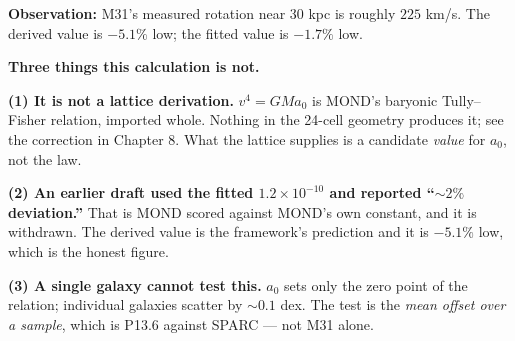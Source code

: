 \documentclass[11pt, letterpaper, openany]{book}
\begin{document}
\textbf{Observation:} M31's measured rotation near 30 kpc is roughly $225$ km/s. The derived value
is $-5.1\%$ low; the fitted value is $-1.7\%$ low.

\begin{warningbox}
\textbf{Three things this calculation is not.}

\medskip
\textbf{(1) It is not a lattice derivation.} $v^4 = GM a_0$ is MOND's baryonic Tully--Fisher
relation, imported whole. Nothing in the 24-cell geometry produces it; see the correction in
Chapter 8. What the lattice supplies is a candidate \emph{value} for $a_0$, not the law.

\medskip
\textbf{(2) An earlier draft used the fitted $1.2\times10^{-10}$ and reported ``$\sim 2\%$
deviation.''} That is MOND scored against MOND's own constant, and it is withdrawn. The derived
value is the framework's prediction and it is $-5.1\%$ low, which is the honest figure.

\medskip
\textbf{(3) A single galaxy cannot test this.} $a_0$ sets only the zero point of the relation;
individual galaxies scatter by $\sim 0.1$ dex. The test is the \emph{mean offset over a sample},
which is P13.6 against SPARC --- not M31 alone.
\end{warningbox}

\vspace{0.5cm}
\begin{center}
\end{center}
\end{document}
